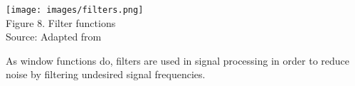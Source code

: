 \begin{center}
    \texttt{[image: images/filters.png]}\\
    Figure 8. Filter functions
\\Source: Adapted from \cite{filterImg}
\end{center}

As window functions do, filters are used in signal processing in order to reduce noise by filtering undesired signal frequencies.
